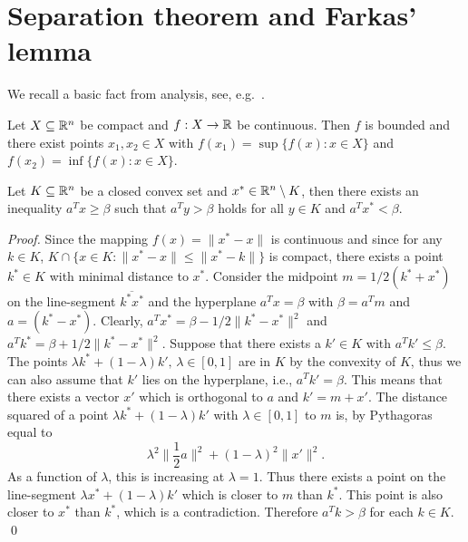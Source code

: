 \section{Separation theorem and Farkas' lemma}
\label{conv:sec:separ-theor-fark}


We recall a basic fact from analysis, see,
e.g.~\cite[Theorem~4.4.1]{MarsdenHoffman93}. 

\begin{theorem}
  \label{conv:thr:11}
  Let $X\subseteq\mathbb{R}^n$ be compact and $f: X \to \mathbb{R}$ be continuous. Then $f$ is
  bounded and there exist
  points $x_1,x_2 \in X$ with $f(x_1) = \sup\{ f(x) \colon  x \in X\}$ and
  $f(x_2) = \inf \{ f(x) \colon x \in X\}$. 
\end{theorem}


\begin{theorem}
  \label{conv:thr:10}
  Let $K\subseteq\mathbb{R}^n$ be a closed  convex set and $x^* \in \mathbb{R}^n \setminus K$, then there
  exists an inequality $a^Tx\geq\beta$ such that $a^T y > \beta$ holds for all
  $y \in K$ and $a^Tx^*<\beta$. 
\end{theorem}

\begin{proof}
  Since the mapping $f(x) = \|x^*-x\|$ is continuous and since for any
  $k \in K$, $K \cap \{ x \in K \colon \|x^* - x\|\leq \|x^* - k\|\}$ is
  compact, there exists a point $k^* \in K$ with minimal distance to
  $x^*$. Consider the midpoint $m = 1/2(k^*+x^*)$ on the line-segment
  $\overline{k^*x^*}$   and the hyperplane $a^Tx = \beta$ with $\beta = a^Tm$ and $a =
  (k^*-x^*)$. Clearly, $a^T x^* = \beta - 1/2 \|k^*-x^*\|^2$ and $a^T k^*
  = \beta +  1/2 \|k^*-x^*\|^2$. Suppose that there exists a $k' \in K$
  with $a^T k' \leq \beta$. The points $\lambda k^* + (1-\lambda) k', \,\lambda \in [0,1]$ are in 
  $K$ by the convexity of $K$, thus we can also assume that $k'$ lies
  on the hyperplane, i.e., $a^Tk' = \beta$. This means that there exists
  a vector $x'$ which is orthogonal to $a$   and $k' = m +
  x'$. The distance squared  of a point $\lambda k^* + (1-\lambda) k'$  with $\lambda \in [0,1]$
  to $m$  is, by Pythagoras equal to 
  \begin{displaymath}
    \lambda^2  \|\frac{1}{2} a\|^2 + (1-\lambda)^2 \|x'\|^2.
  \end{displaymath}
  As a function of $\lambda$, this is increasing 
  at $\lambda=1$. Thus there exists a point on the line-segment $\lambda x^* +
  (1-\lambda) k'$  which is closer to $m$ than $k^*$. This point is also
  closer to $x^*$ than $k^*$, which is a contradiction.  Therefore
  $a^Tk >\beta$ for each $k \in K$. 
  \qed 
\end{proof}



